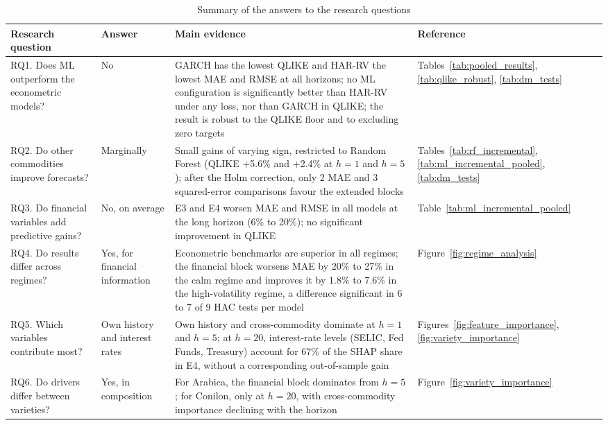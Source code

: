 \documentclass[a4paper,fleqn]{cas-sc}
\begin{document}
\begin{table}[t]
\centering
\caption{Summary of the answers to the research questions}
\label{tab:rq_summary}
\scriptsize
\setlength{\tabcolsep}{3pt}
\begin{tabular*}{\textwidth}{@{\extracolsep{\fill}}p{3.4cm}p{2.1cm}p{7.6cm}p{2.2cm}@{}}
\hline
Research question & Answer & Main evidence & Reference \\
\hline
RQ1. Does ML outperform the econometric models? & No & GARCH has the lowest QLIKE and HAR-RV the lowest MAE and RMSE at all horizons; no ML configuration is significantly better than HAR-RV under any loss, nor than GARCH in QLIKE; the result is robust to the QLIKE floor and to excluding zero targets & Tables~\ref{tab:pooled_results}, \ref{tab:qlike_robust}, \ref{tab:dm_tests} \\
\hline
RQ2. Do other commodities improve forecasts? & Marginally & Small gains of varying sign, restricted to Random Forest (QLIKE +5.6\% and +2.4\% at \(h=1\) and \(h=5\)); after the Holm correction, only 2 MAE and 3 squared-error comparisons favour the extended blocks & Tables~\ref{tab:rf_incremental}, \ref{tab:ml_incremental_pooled}, \ref{tab:dm_tests} \\
\hline
RQ3. Do financial variables add predictive gains? & No, on average & E3 and E4 worsen MAE and RMSE in all models at the long horizon (6\% to 20\%); no significant improvement in QLIKE & Table~\ref{tab:ml_incremental_pooled} \\
\hline
RQ4. Do results differ across regimes? & Yes, for financial information & Econometric benchmarks are superior in all regimes; the financial block worsens MAE by 20\% to 27\% in the calm regime and improves it by 1.8\% to 7.6\% in the high-volatility regime, a difference significant in 6 to 7 of 9 HAC tests per model & Figure~\ref{fig:regime_analysis} \\
\hline
RQ5. Which variables contribute most? & Own history and interest rates & Own history and cross-commodity dominate at \(h=1\) and \(h=5\); at \(h=20\), interest-rate levels (SELIC, Fed Funds, Treasury) account for 67\% of the SHAP share in E4, without a corresponding out-of-sample gain & Figures~\ref{fig:feature_importance}, \ref{fig:variety_importance} \\
\hline
RQ6. Do drivers differ between varieties? & Yes, in composition & For Arabica, the financial block dominates from \(h=5\); for Conilon, only at \(h=20\), with cross-commodity importance declining with the horizon & Figure~\ref{fig:variety_importance} \\
\hline
\end{tabular*}
\end{table}
\end{document}
